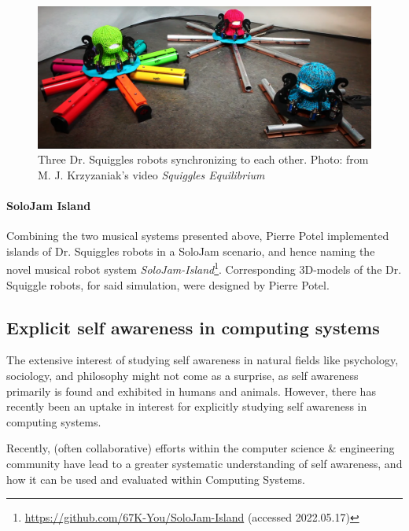 			\begin{figure}[!htp]
			\centering
				\includegraphics[width=\columnwidth]{Assets/DocSegments/Chapters/Background/Figures/Photos/dr_squiggles_synchronizing.png}
				\caption[Three Dr. Squiggles robots synchronizing to each other.]{Three Dr. Squiggles robots synchronizing to each other. Photo: from M. J. Krzyzaniak's video \textit{Squiggles Equilibrium}\protect\footnotemark}
				\label{fig:background_dr_squiggles_synchronizing}
			\end{figure}
			
			
			\paragraph{SoloJam Island \nl}
			\label{solojam_island}
			
			Combining the two musical systems presented above, Pierre Potel implemented islands of Dr. Squiggles robots in a SoloJam scenario, and hence naming the novel musical robot system \textit{SoloJam-Island}\footnote{\url{https://github.com/67K-You/SoloJam-Island} (accessed 2022.05.17)}. Corresponding 3D-models of the Dr. Squiggle robots, for said simulation, were designed by Pierre Potel.
			

	\subsection{Explicit self awareness in computing systems}
	The extensive interest of studying self awareness in natural fields like psychology, sociology, and philosophy might not come as a surprise, as self awareness primarily is found and exhibited in humans and animals. However, there has recently been an uptake in interest for explicitly studying self awareness in computing systems.

	Recently, (often collaborative) efforts within the computer science \& engineering community \cite{sacs16_ch2, sacs17_ch1, sacs17_ch3} have lead to a greater systematic understanding of self awareness, and how it can be used and evaluated within Computing Systems.


